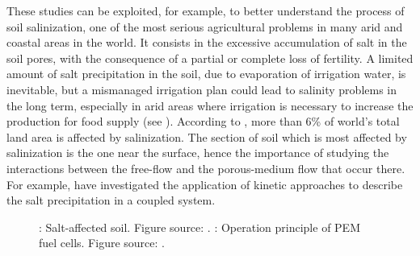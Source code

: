 These studies can be exploited, for example, to better understand the process 
of soil salinization, one of the most serious agricultural problems in 
many arid and coastal areas in the world. It consists in the excessive 
accumulation of salt in the soil pores, with the consequence of a partial or 
complete loss of fertility. A limited amount of salt precipitation in the soil, 
due to evaporation of irrigation water, is inevitable, but a mismanaged irrigation plan could lead to salinity problems in the long term, especially in arid 
areas where irrigation is necessary to increase the production for food supply 
(see \cite{web:fao}). According to \cite{soil:munns}, more than 6\% of world's 
total land area is affected by salinization.
The section of soil which is most affected by salinization is the one near the surface, hence the importance of studying the interactions between the free-flow and the porous-medium flow that occur there.
For example, \textcite{intro:salinization} have investigated the application of kinetic 
approaches to describe the salt precipitation in a coupled system.
\begin{figure}
	\centering
	\caption[Salt-affected soil and operation principle of PEM fuel 
	cells]{\protect{}: Salt-affected soil. Figure source: 
	\cite{web:fao}. \protect{}: Operation principle of PEM fuel 
	cells. Figure source: \cite{intro:pemfig}.}
	\label{fig:intro2}
\end{figure}

